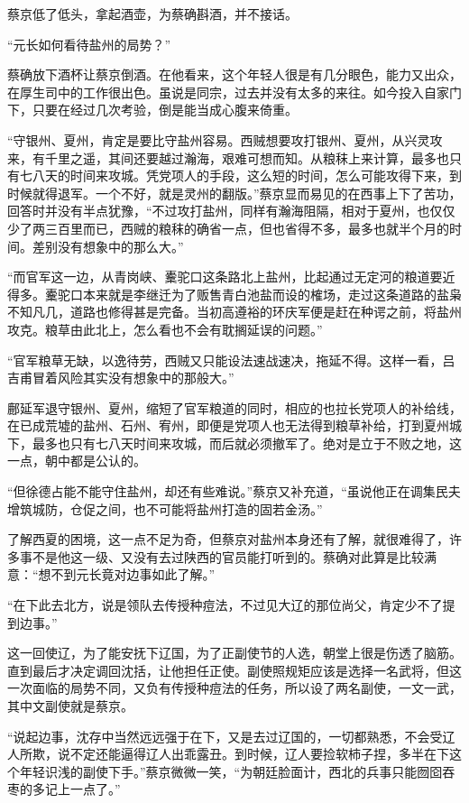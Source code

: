 蔡京低了低头，拿起酒壶，为蔡确斟酒，并不接话。

“元长如何看待盐州的局势？”

蔡确放下酒杯让蔡京倒酒。在他看来，这个年轻人很是有几分眼色，能力又出众，在厚生司中的工作很出色。虽说是同宗，过去并没有太多的来往。如今投入自家门下，只要在经过几次考验，倒是能当成心腹来倚重。

“守银州、夏州，肯定是要比守盐州容易。西贼想要攻打银州、夏州，从兴灵攻来，有千里之遥，其间还要越过瀚海，艰难可想而知。从粮秣上来计算，最多也只有七八天的时间来攻城。凭党项人的手段，这么短的时间，怎么可能攻得下来，到时候就得退军。一个不好，就是灵州的翻版。”蔡京显而易见的在西事上下了苦功，回答时并没有半点犹豫，“不过攻打盐州，同样有瀚海阻隔，相对于夏州，也仅仅少了两三百里而已，西贼的粮秣的确省一点，但也省得不多，最多也就半个月的时间。差别没有想象中的那么大。”

“而官军这一边，从青岗峡、櫜驼口这条路北上盐州，比起通过无定河的粮道要近得多。櫜驼口本来就是李继迁为了贩售青白池盐而设的榷场，走过这条道路的盐枭不知凡几，道路也修得甚是完备。当初高遵裕的环庆军便是赶在种谔之前，将盐州攻克。粮草由此北上，怎么看也不会有耽搁延误的问题。”

“官军粮草无缺，以逸待劳，西贼又只能设法速战速决，拖延不得。这样一看，吕吉甫冒着风险其实没有想象中的那般大。”

鄜延军退守银州、夏州，缩短了官军粮道的同时，相应的也拉长党项人的补给线，在已成荒墟的盐州、石州、宥州，即便是党项人也无法得到粮草补给，打到夏州城下，最多也只有七八天时间来攻城，而后就必须撤军了。绝对是立于不败之地，这一点，朝中都是公认的。

“但徐德占能不能守住盐州，却还有些难说。”蔡京又补充道，“虽说他正在调集民夫增筑城防，仓促之间，也不可能将盐州打造的固若金汤。”

了解西夏的困境，这一点不足为奇，但蔡京对盐州本身还有了解，就很难得了，许多事不是他这一级、又没有去过陕西的官员能打听到的。蔡确对此算是比较满意：“想不到元长竟对边事如此了解。”

“在下此去北方，说是领队去传授种痘法，不过见大辽的那位尚父，肯定少不了提到边事。”

这一回使辽，为了能安抚下辽国，为了正副使节的人选，朝堂上很是伤透了脑筋。直到最后才决定调回沈括，让他担任正使。副使照规矩应该是选择一名武将，但这一次面临的局势不同，又负有传授种痘法的任务，所以设了两名副使，一文一武，其中文副使就是蔡京。

“说起边事，沈存中当然远远强于在下，又是去过辽国的，一切都熟悉，不会受辽人所欺，说不定还能逼得辽人出乖露丑。到时候，辽人要捡软柿子捏，多半在下这个年轻识浅的副使下手。”蔡京微微一笑，“为朝廷脸面计，西北的兵事只能囫囵吞枣的多记上一点了。”

